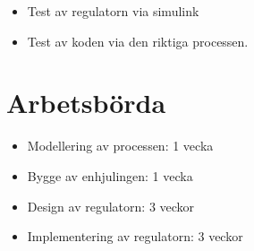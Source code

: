 \documentclass[a4paper]{article}
\begin{document}
    \begin{itemize}
    \item [] Test av regulatorn via simulink
    \item [] Test av koden via den riktiga processen.
    \end{itemize}
    
    
\section{Arbetsbörda}

\begin{itemize}
\item[] Modellering av processen: 1 vecka

\item[] Bygge av enhjulingen: 1 vecka

\item[] Design av regulatorn: 3 veckor

\item[] Implementering av regulatorn: 3 veckor
\end{itemize}
\end{document}
